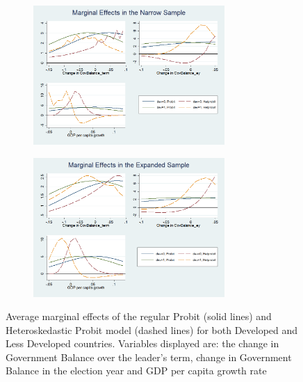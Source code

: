\begin{figure}[H]
    \centering
    \label{figure:marginal effects}
        \begin{subfigure}[H]{1\textwidth}
    \centering
    \includegraphics[width=0.8\textwidth]{AME_Narrow.png}
    \end{subfigure}
    \begin{subfigure}[H]{1\textwidth}
    \centering
    \includegraphics[width=0.8\textwidth]{AME_expanded.png}
    \end{subfigure}
    \caption{\small{Average marginal effects of the regular Probit (solid lines) and Heteroskedastic Probit model (dashed lines) for both Developed and Less Developed countries. Variables displayed are: the change in Government Balance over the leader's term, change in Government Balance in the election year and GDP per capita growth rate}}
    \label{Predicted_Expanded}
\end{figure}
